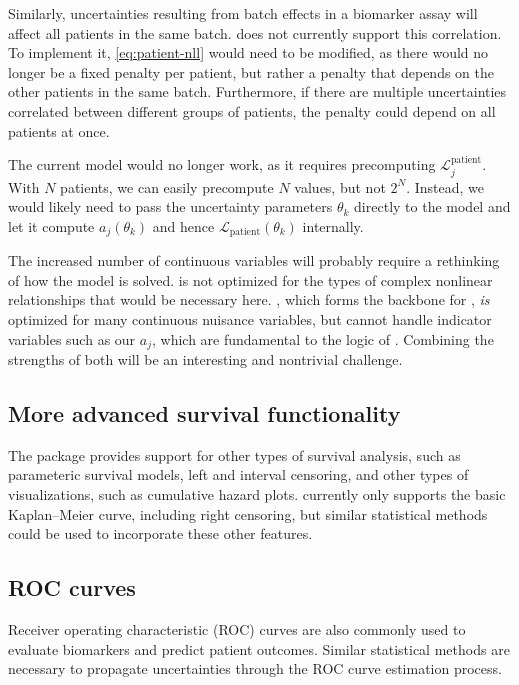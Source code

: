 \documentclass[article]{jss}
\newcommand{\KM}{Kaplan--Meier} %
\begin{document}
Similarly, uncertainties resulting from batch effects in a biomarker assay will affect all patients in the same batch\@.  does not currently support this correlation. To implement it, \cref{eq:patient-nll} would need to be modified, as there would no longer be a fixed penalty per patient, but rather a penalty that depends on the other patients in the same batch. Furthermore, if there are multiple uncertainties correlated between different groups of patients, the penalty could depend on all patients at once.

The current  model would no longer work, as it requires precomputing \(\mathcal{L}_j^{\text{patient}}\). With \(N\) patients, we can easily precompute \(N\) values, but not \(2^N\). Instead, we would likely need to pass the uncertainty parameters \(\theta_k\) directly to the  model and let it compute \(a_j\left(\theta_k\right)\) and hence \(\mathcal{L}_{\text{patient}}\left(\theta_k\right)\) internally.

The increased number of continuous variables will probably require a rethinking of how the model is solved\@.  is not optimized for the types of complex nonlinear relationships that would be necessary here\@. , which forms the backbone for , \emph{is} optimized for many continuous nuisance variables, but cannot handle indicator variables such as our \(a_j\), which are fundamental to the logic of . Combining the strengths of both will be an interesting and nontrivial challenge.

\subsection{More advanced survival functionality}

The  package provides support for other types of survival analysis, such as parameteric survival models, left and interval censoring, and other types of visualizations, such as cumulative hazard plots\@.  currently only supports the basic \KM{} curve, including right censoring, but similar statistical methods could be used to incorporate these other features.

\subsection{ROC curves}

Receiver operating characteristic (ROC) curves are also commonly used to evaluate biomarkers and predict patient outcomes. Similar statistical methods are necessary to propagate uncertainties through the ROC curve estimation process.
\end{document}
